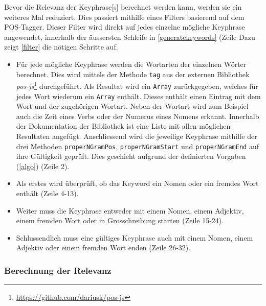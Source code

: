 
Bevor die Relevanz der \gls{Keyphrase}[s] berechnet werden kann, werden sie ein weiteres Mal reduziert. Dies passiert mithilfe eines Filters basierend auf dem POS-Tagger. Dieser Filter wird direkt auf jedes einzelne mögliche \gls{Keyphrase} angewendet, innerhalb der äussersten Schleife in \autoref{generatekeywords} (Zeile Dazu zeigt \autoref{filter} die nötigen Schritte auf.
\begin{itemize}
    \item Für jede mögliche \gls{Keyphrase} werden die Wortarten der einzelnen Wörter berechnet. Dies wird mittels der Methode \texttt{tag} aus der externen Bibliothek \textit{pos-js}\footnote{\url{https://github.com/dariusk/pos-js}} durchgeführt. Als Resultat wird ein \texttt{Array} zurückgegeben, welches für jedes Wort wiederum ein \texttt{Array} enthält. Dieses enthält einen Eintrag mit dem Wort und der zugehörigen Wortart. Neben der Wortart wird zum Beispiel auch die Zeit eines Verbs oder der Numerus eines Nomens erkannt. Innerhalb der Dokumentation der Bibliothek ist eine Liste mit allen möglichen Resultaten angefügt. Anschliessend wird die jeweilige \gls{Keyphrase} mithilfe der drei Methoden \texttt{properNGramPos}, \texttt{properNGramStart} und \texttt{properNGramEnd} auf ihre Gültigkeit geprüft. Dies geschieht aufgrund der definierten Vorgaben (\autoref{algo}) (Zeile 2). 
    \item Als erstes wird überprüft, ob das \gls{Keyword} ein Nomen oder ein fremdes Wort enthält (Zeile 4-13).
    \item Weiter muss die \gls{Keyphrase} entweder mit einem Nomen, einem Adjektiv, einem fremden Wort oder in Grosschreibung starten (Zeile 15-24).
    \item Schlussendlich muss eine gültiges \gls{Keyphrase} auch mit einem Nomen, einem Adjektiv oder einem fremden Wort enden (Zeile 26-32).
\end{itemize}




\subsubsection{Berechnung der Relevanz}

